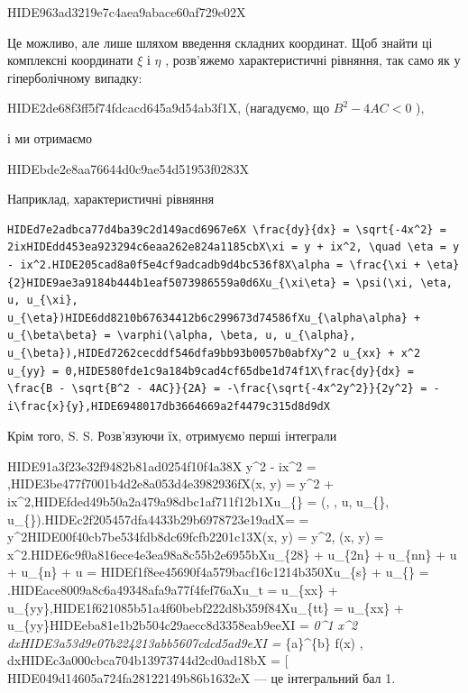 \documentclass[
  ukrainian,
]{article}
\begin{document}
HIDE963ad3219e7c4aea9abace60af729e02X

Це можливо, але лише шляхом введення складних координат. Щоб знайти ці
комплексні координати \(\xi\) і \(\eta\) , розв'яжемо характеристичні
рівняння, так само як у гіперболічному випадку:

HIDE2de68f3ff5f74fdcacd645a9d54ab3f1X, (нагадуємо, що \(B^2 - 4AC < 0\)
),

і ми отримаємо

HIDEbde2e8aa76644d0c9ae54d51953f0283X

Наприклад, характеристичні рівняння

\begin{verbatim}
HIDEd7e2adbca77d4ba39c2d149acd6967e6X \frac{dy}{dx} = \sqrt{-4x^2} = 2ixHIDEdd453ea923294c6eaa262e824a1185cbX\xi = y + ix^2, \quad \eta = y - ix^2.HIDE205cad8a0f5e4cf9adcadb9d4bc536f8X\alpha = \frac{\xi + \eta}{2}HIDE9ae3a9184b444b1eaf5073986559a0d6Xu_{\xi\eta} = \psi(\xi, \eta, u, u_{\xi}, u_{\eta})HIDE6dd8210b67634412b6c299673d74586fXu_{\alpha\alpha} + u_{\beta\beta} = \varphi(\alpha, \beta, u, u_{\alpha}, u_{\beta}),HIDEd7262cecddf546dfa9bb93b0057b0abfXy^2 u_{xx} + x^2 u_{yy} = 0,HIDE580fde1c9a184b9cad4cf65dbe1d74f1X\frac{dy}{dx} = \frac{B - \sqrt{B^2 - 4AC}}{2A} = -\frac{\sqrt{-4x^2y^2}}{2y^2} = -i\frac{x}{y},HIDE6948017db3664669a2f4479c315d8d9dX
\end{verbatim}

Крім того, S. S. Розв'язуючи їх, отримуємо перші інтеграли

HIDE91a3f23e32f9482b81ad0254f10f4a38X y\^{}2 - ix\^{}2 =
,HIDE3be477f7001b4d2e8a053d4e3982936fX\xi(x, y) = y\^{}2 +
ix\^{}2,HIDEfded49b50a2a479a98dbc1af711f12b1Xu\_\{\xi\eta\} = \psi(\xi,
\eta, u, u\_\{\xi\},
u\_\{\eta\}).HIDEc2f205457dfa4433b29b6978723e19adX\alpha =
 = y\^{}2HIDE00f40cb7be534fdb8dc69fcfb2201c13X\xi(x,
y) = y\^{}2, \quad \eta(x, y) =
x\^{}2.HIDE6c9f0a816ece4e3ea98a8c55b2e6955bXu\_\{28\} +
u\_\{2n\} + u\_\{nn\} + u +
u\_\{n\} + u =
HIDEf1f8ee45690f4a579bacf16c1214b350Xu\_\{s\xi\} +
u\_\{\eta\eta\} =
.HIDEace8009a8c6a49348afa9a77f4fef76aXu\_t
= u\_\{xx\} + u\_\{yy\},HIDE1f621085b51a4f60bebf222d8b359f84Xu\_\{tt\} =
u\_\{xx\} + u\_\{yy\}HIDEeba81e1b2b504c29aecc8d3358eab9eeXI =
\int\emph{0\^{}1 x\^{}2 dxHIDE3a53d9e07b224213abb5607cdcd5ad9eXI =
\int}\{a\}\^{}\{b\} f(x) ,
dxHIDEc3a000cbca704b13973744d2cd0ad18bX = \Big[
HIDE049d14605a724fa28122149b86b1632eX — це інтегральний бал 1.
\end{document}
